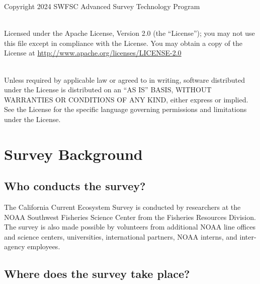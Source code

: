 \documentclass[
  letterpaper,
  oneside,
  open=any]{scrbook}
\begin{document}
Copyright 2024 SWFSC Advanced Survey Technology Program\\
\strut \\
Licensed under the Apache License, Version 2.0 (the ``License''); you
may not use this file except in compliance with the License. You may
obtain a copy of the License at
\url{http://www.apache.org/licenses/LICENSE-2.0}\\
\strut \\
Unless required by applicable law or agreed to in writing, software
distributed under the License is distributed on an ``AS IS'' BASIS,
WITHOUT WARRANTIES OR CONDITIONS OF ANY KIND, either express or implied.
See the License for the specific language governing permissions and
limitations under the License.


\chapter{Survey Background}\label{survey-background}

\section{Who conducts the survey?}\label{who-conducts-the-survey}

The California Current Ecosystem Survey is conducted by researchers at
the NOAA Southwest Fisheries Science Center from the Fisheries Resources
Division. The survey is also made possible by volunteers from additional
NOAA line offices and science centers, universities, international
partners, NOAA interns, and inter-agency employees.

\section{Where does the survey take
place?}\label{where-does-the-survey-take-place}
\end{document}

